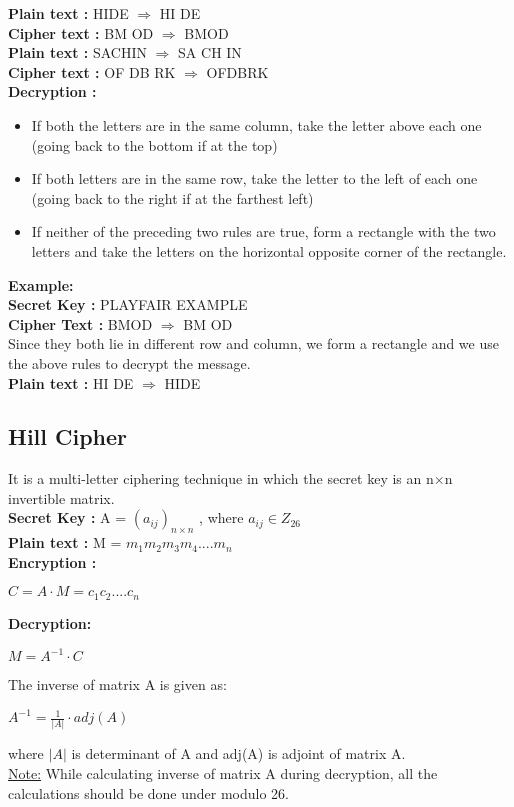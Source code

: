 \documentclass[11pt]{article}
\begin{document}
\textbf{Plain text : } HIDE $\Rightarrow$ HI DE\\
\textbf{Cipher text : } BM OD $\Rightarrow$ BMOD\\
\textbf{Plain text : } SACHIN $\Rightarrow$ SA CH IN\\
\textbf{Cipher text : } OF DB RK $\Rightarrow$ OFDBRK\\
\textbf{Decryption :}\\
\begin{itemize}
    \item If both the letters are in the same column, take the letter above each one (going back to the bottom if at the top)
    \item If both letters are in the same row, take the letter to the left of each one (going back to the right if at the farthest left)
    \item If neither of the preceding two rules are true, form a rectangle with the two letters and take the letters on the horizontal opposite corner of the rectangle.
\end{itemize}
\textbf{Example:}\\
\textbf{Secret Key :} PLAYFAIR EXAMPLE\\
\textbf{Cipher Text :} BMOD $\Rightarrow$ BM OD\\
Since they both lie in different row and column, we form a rectangle and we use the above rules to decrypt the message.\\
\textbf{Plain text : } HI DE $\Rightarrow$ HIDE\\
\subsection{Hill Cipher}
It is a multi-letter ciphering technique in which the secret key is an n$\times$n invertible matrix.\\
\textbf{Secret Key :} A = $(a_{ij})_{n \times n}$ ,   where $a_{ij} \in Z_{26}$\\
\textbf{Plain text :} M = $m_1 m_2 m_3 m_4....m_n$\\
\textbf{Encryption :} \\
\begin{center}
    $C = A \cdot M = c_1c_2....c_n$
\end{center}
\textbf{Decryption:}\\
\begin{center}
    $M = A^{-1} \cdot C$
\end{center}
The inverse of matrix A is given as:
\begin{center}
    $A^{-1} = \frac {1}{|A|} \cdot adj(A)$
\end{center}
where $|A|$ is determinant of A and adj(A) is adjoint of matrix A.\\
\underline{Note:}
While calculating inverse of matrix A during decryption, all the calculations should be done under modulo 26.
\end{document}
